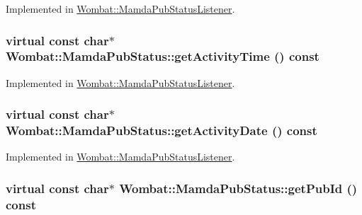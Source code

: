 Implemented in \hyperlink{classWombat_1_1MamdaPubStatusListener_6a45bb477632be814f1a3bd00082c06c}{Wombat::Mamda\-Pub\-Status\-Listener}.\hypertarget{classWombat_1_1MamdaPubStatus_fe58ce33fc151a3cd9d64f82e27a2058}{
\subsubsection[getActivityTime]{\setlength{\rightskip}{0pt plus 5cm}virtual const char$\ast$ Wombat::Mamda\-Pub\-Status::get\-Activity\-Time () const}}
\label{classWombat_1_1MamdaPubStatus_fe58ce33fc151a3cd9d64f82e27a2058}




Implemented in \hyperlink{classWombat_1_1MamdaPubStatusListener_ffedad037842c408272dbded18f676f6}{Wombat::Mamda\-Pub\-Status\-Listener}.\hypertarget{classWombat_1_1MamdaPubStatus_2d1131459438c3e833583d0233c1c102}{
\subsubsection[getActivityDate]{\setlength{\rightskip}{0pt plus 5cm}virtual const char$\ast$ Wombat::Mamda\-Pub\-Status::get\-Activity\-Date () const}}
\label{classWombat_1_1MamdaPubStatus_2d1131459438c3e833583d0233c1c102}




Implemented in \hyperlink{classWombat_1_1MamdaPubStatusListener_0b14cc9aec4ec454b0095cf4f82fab5e}{Wombat::Mamda\-Pub\-Status\-Listener}.\hypertarget{classWombat_1_1MamdaPubStatus_31447dec5db0e9837e8816a03cba88e4}{
\subsubsection[getPubId]{\setlength{\rightskip}{0pt plus 5cm}virtual const char$\ast$ Wombat::Mamda\-Pub\-Status::get\-Pub\-Id () const}}
\label{classWombat_1_1MamdaPubStatus_31447dec5db0e9837e8816a03cba88e4}




